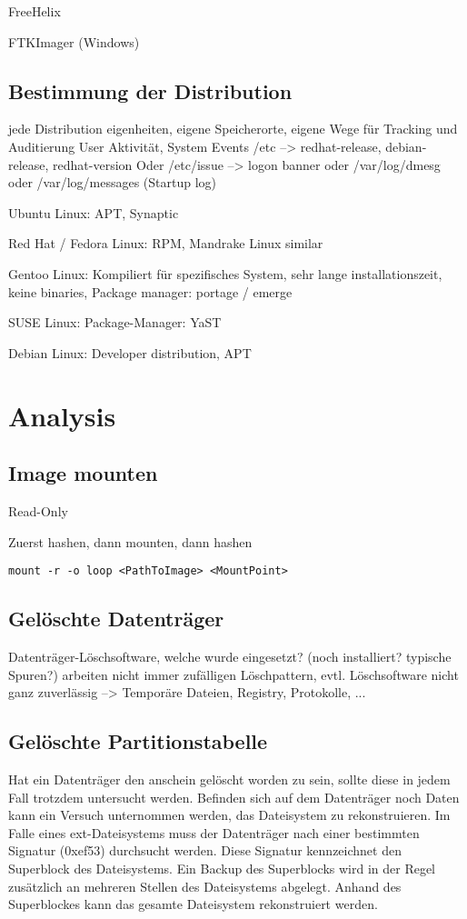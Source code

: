 FreeHelix

FTKImager (Windows)


\subsection{Bestimmung der Distribution}
jede Distribution eigenheiten, eigene Speicherorte, eigene Wege für Tracking und Auditierung User Aktivität, System Events
/etc --> redhat-release, debian-release, redhat-version
Oder /etc/issue --> logon banner
oder /var/log/dmesg oder /var/log/messages (Startup log)

Ubuntu Linux: APT, Synaptic

Red Hat / Fedora Linux: RPM, Mandrake Linux similar

Gentoo Linux: Kompiliert für spezifisches System, sehr lange installationszeit, keine binaries, Package manager: portage / emerge

SUSE Linux: Package-Manager: YaST

Debian Linux: Developer distribution, APT

\section{Analysis}

\subsection{Image mounten}
Read-Only

Zuerst hashen, dann mounten, dann hashen
\begin{verbatim}
mount -r -o loop <PathToImage> <MountPoint>
\end{verbatim}

\subsection{Gelöschte Datenträger}
Datenträger-Löschsoftware, welche wurde eingesetzt? (noch installiert? typische Spuren?) arbeiten nicht immer zufälligen Löschpattern, evtl. Löschsoftware nicht ganz zuverlässig --> Temporäre Dateien, Registry, Protokolle, ...


\subsection{Gelöschte Partitionstabelle}
Hat ein Datenträger den anschein gelöscht worden zu sein, sollte diese in jedem Fall trotzdem untersucht werden. Befinden sich auf dem Datenträger noch Daten kann ein Versuch unternommen werden, das Dateisystem zu rekonstruieren. Im Falle eines ext-Dateisystems muss der Datenträger nach einer bestimmten Signatur (0xef53) durchsucht werden. Diese Signatur kennzeichnet den Superblock des Dateisystems. Ein Backup des Superblocks wird in der Regel zusätzlich an mehreren Stellen des Dateisystems abgelegt. Anhand des Superblockes kann das gesamte Dateisystem rekonstruiert werden.

